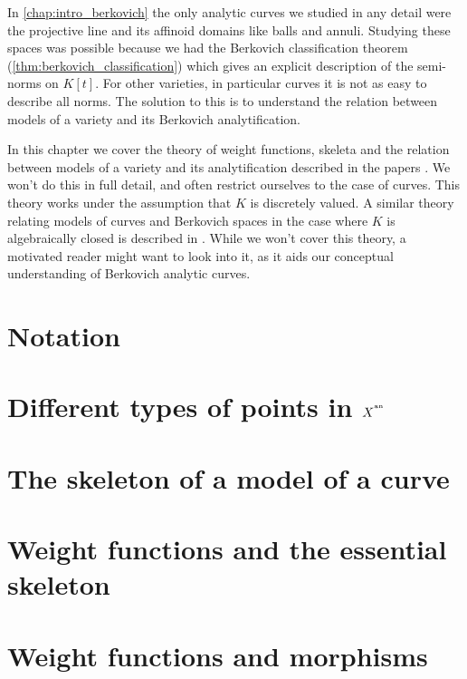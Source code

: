 In \cref{chap:intro_berkovich} the only analytic curves we studied in any detail were the projective line and its affinoid domains like balls and annuli.
Studying these spaces was possible because we had the Berkovich classification  theorem (\cref{thm:berkovich_classification}) which gives an explicit description of the semi-norms on $K[t]$. 
For other varieties, in particular curves it is not as easy to describe all norms.
The solution to this is to understand the relation between models of a variety and its Berkovich analytification. 


In this chapter we cover the theory of weight functions, skeleta and the relation between models of a variety and its analytification described in the papers \cite{mustataWeightFunctionsNonArchimedean2015, nicaiseBerkovichSkeletaBirational2016, bakerWeightFunctionsBerkovich2016}.
We won't do this in full detail, and often restrict ourselves to the case of curves.
This theory works under the assumption that $K$ is discretely valued. 
A similar theory relating models of curves and Berkovich spaces in the case where $K$ is algebraically closed is described in \cite{bakerStructureNonarchimedeanAnalytic2013}. 
While we won't cover this theory, a motivated reader might want to look into it, as it aids our conceptual understanding of Berkovich analytic curves.  



\section{Notation} \label{sec:notation}


\section{Different types of points in $X^{{}^{\text{an}}}$} \label{sec:different_types_of_points_in_xan}


\section{The skeleton of a model of a curve} \label{sec:skeleton_skeleton_of_a_model_of_a_curve}



\section{Weight functions and the essential skeleton} \label{sec:weight_functions_essential_skeleton}


\section{Weight functions and morphisms} \label{sec:weight_functions_and_morphisms}



